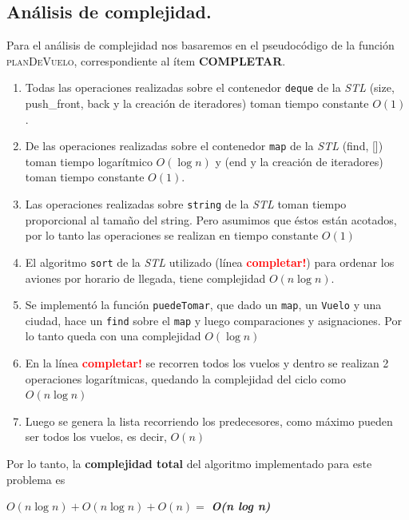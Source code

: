 \newpage
\subsection{Análisis de complejidad.}

\vspace*{0.3cm}

Para el análisis de complejidad nos basaremos en el pseudocódigo de la función
\textsc{planDeVuelo}, correspondiente al ítem \textbf{COMPLETAR}.

\begin{enumerate}
  \item Todas las operaciones realizadas sobre el contenedor \verb|deque| de la
    \textit{STL} (size, push_front, back y la creación de iteradores)
    toman tiempo constante $O(1)$.
  \item De las operaciones realizadas sobre el contenedor \verb|map| de la
    \textit{STL} (find, []) toman tiempo logarítmico $O(\log n)$ y (end y la creación de iteradores)
    toman tiempo constante $O(1)$.
  \item Las operaciones realizadas sobre \verb|string| de la \textit{STL} toman
    tiempo proporcional al tamaño del string. Pero asumimos que éstos están
    acotados, por lo tanto las operaciones se realizan en tiempo constante
    $O(1)$
  \item El algoritmo \verb|sort| de la \textit{STL} utilizado (línea \textcolor{red}{\textbf{completar!}}) para ordenar los aviones
    por horario de llegada, tiene complejidad $O(n \log n)$.
  \item Se implementó la función \verb|puedeTomar|, que dado un \verb|map|, un \verb|Vuelo| y
    una ciudad, hace un \verb|find| sobre el \verb|map| y luego comparaciones y asignaciones.
    Por lo tanto queda con una complejidad $O(\log n)$
  \item En la línea \textcolor{red}{\textbf{completar!}} se recorren todos los vuelos
    y dentro se realizan 2 operaciones logarítmicas, quedando la complejidad del
    ciclo como $O(n \log n)$
  \item Luego se genera la lista recorriendo los predecesores, como máximo pueden ser
    todos los vuelos, es decir, $O(n)$
\end{enumerate}


Por lo tanto, la \textbf{complejidad total} del algoritmo implementado para este problema es

\begin{center}
  $O(n \log n) + O(n \log n) + O(n) =$ \textit{\textbf{O(n log n)}}
\end{center}

